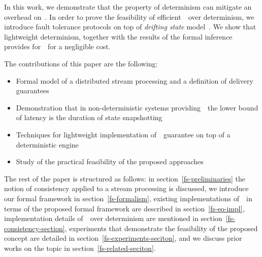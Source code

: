 In this work, we demonstrate that the property of determinism can mitigate an overhead on~\eo. 
In order to prove the feasibility of efficient~\eo\ over determinism, we introduce fault tolerance protocols on top of {\em drifting state} model~\cite{we2018adbis}. 
We show that lightweight determinism, together with the results of the formal inference provides for~\eo\ for a negligible cost.

The contributions of this paper are the following: 
\begin{itemize}
    \item Formal model of a distributed stream processing  and   a   definition of  delivery guarantees 
    \item Demonstration that in non-deterministic systems providing~\eo\, the lower bound of latency is the duration of state snapshotting
    \item Techniques for lightweight implementation of~\eo\ guarantee on top of a deterministic engine
    \item Study of the practical feasibility of the proposed approaches
\end{itemize}

The rest of the paper is structured as follows: 
in section~\ref{fs-preliminaries} the notion of consistency applied to a stream processing is discussed, 
we introduce our formal framework in section~\ref{fs-formalism}, 
existing implementations of~\eo\ in terms of the proposed formal framework are described in section~\ref{fs-eo-impl}, 
implementation details of~\eo\ over determinism are mentioned in section~\ref{fs-consistency-section}, 
experiments that demonstrate the feasibility of the proposed concept are detailed in section~\ref{fs-experiments-seciton}, 
and we discuss prior works on the topic in section~\ref{fs-related-seciton}. 
